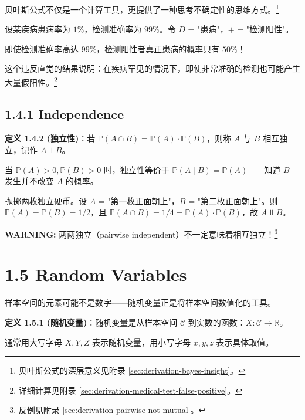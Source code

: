 贝叶斯公式不仅是一个计算工具，更提供了一种思考不确定性的思维方式。\footnote{贝叶斯公式的深层意义见附录 \cref{sec:derivation-bayes-insight}。}

\begin{example}[医学检测]\label{ex:medical-test-ch1}
设某疾病患病率为 $1\%$，检测准确率为 $99\%$。令 $D$ = "患病"，$+$ = "检测阳性"。

即使检测准确率高达 $99\%$，检测阳性者真正患病的概率只有 $50\%$！

这个违反直觉的结果说明：在疾病罕见的情况下，即使非常准确的检测也可能产生大量假阳性。\footnote{详细计算见附录 \cref{sec:derivation-medical-test-false-positive}。}
\end{example}

\subsection{1.4.1 Independence}

\begin{remark}
\textbf{定义 1.4.2 (独立性)}：若 $\mathbb{P}(A \cap B) = \mathbb{P}(A) \cdot \mathbb{P}(B)$，则称 $A$ 与 $B$ 相互独立，记作 $A \Perp B$。

当 $\mathbb{P}(A) > 0, \mathbb{P}(B) > 0$ 时，独立性等价于 $\mathbb{P}(A \mid B) = \mathbb{P}(A)$——知道 $B$ 发生并不改变 $A$ 的概率。
\end{remark}

\begin{example}[独立硬币]\label{ex:independence-ch1}
抛掷两枚独立硬币。设 $A$ = "第一枚正面朝上"，$B$ = "第二枚正面朝上"。则 $\mathbb{P}(A) = \mathbb{P}(B) = 1/2$，且 $\mathbb{P}(A \cap B) = 1/4 = \mathbb{P}(A) \cdot \mathbb{P}(B)$，故 $A \Perp B$。
\end{example}

\textbf{WARNING:} 两两独立（pairwise independent）不一定意味着相互独立！\footnote{反例见附录 \cref{sec:derivation-pairwise-not-mutual}。}

\section{1.5 Random Variables}\label{sec:1.5}

样本空间的元素可能不是数字——随机变量正是将样本空间数值化的工具。

\begin{remark}
\textbf{定义 1.5.1 (随机变量)}：随机变量是从样本空间 $\mathcal{C}$ 到实数的函数：$X: \mathcal{C} \to \mathbb{R}$。

通常用大写字母 $X, Y, Z$ 表示随机变量，用小写字母 $x, y, z$ 表示具体取值。
\end{remark}

